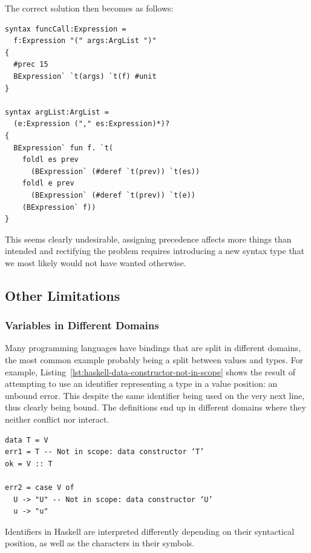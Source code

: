 \documentclass{kththesis}
\begin{document}
The correct solution then becomes as follows:

\begin{verbatim}
syntax funcCall:Expression =
  f:Expression "(" args:ArgList ")"
{
  #prec 15
  BExpression` `t(args) `t(f) #unit
}

syntax argList:ArgList =
  (e:Expression ("," es:Expression)*)?
{
  BExpression` fun f. `t(
    foldl es prev
      (BExpression` (#deref `t(prev)) `t(es))
    foldl e prev
      (BExpression` (#deref `t(prev)) `t(e))
    (BExpression` f))
}
\end{verbatim}

This seems clearly undesirable, assigning precedence affects more things than intended and rectifying the problem requires introducing a new syntax type that we most likely would not have wanted otherwise.

\subsection{Other Limitations}

\subsubsection{Variables in Different Domains}


Many programming languages have bindings that are split in different domains, the most common example probably being a split between values and types. For example, Listing~\ref{lst:haskell-data-constructor-not-in-scope} shows the result of attempting to use an identifier representing a type in a value position: an unbound error. This despite the same identifier being used on the very next line, thus clearly being bound. The definitions end up in different domains where they neither conflict nor interact.

\begin{listing}[t]
\begin{verbatim}
data T = V
err1 = T -- Not in scope: data constructor ‘T’
ok = V :: T

err2 = case V of
  U -> "U" -- Not in scope: data constructor ‘U’
  u -> "u"
\end{verbatim}
\caption{Identifiers in Haskell are interpreted differently depending on their syntactical position, as well as the characters in their symbols.}
\label{lst:haskell-data-constructor-not-in-scope}
\end{listing}
\end{document}
